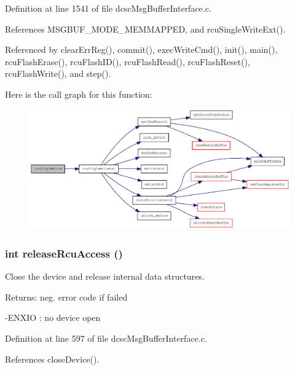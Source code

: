 Definition at line 1541 of file dcsc\-Msg\-Buffer\-Interface.c.

References MSGBUF\_\-MODE\_\-MEMMAPPED, and rcu\-Single\-Write\-Ext().

Referenced by clear\-Err\-Reg(), commit(), exec\-Write\-Cmd(), init(), main(), rcu\-Flash\-Erase(), rcu\-Flash\-ID(), rcu\-Flash\-Read(), rcu\-Flash\-Reset(), rcu\-Flash\-Write(), and step().

Here is the call graph for this function:\begin{figure}[H]
\begin{center}
\leavevmode
\includegraphics[width=349pt]{group__dcsc__msg__buffer__access_g5b2ecab6b0a6383afebde1ea486dae43_cgraph}
\end{center}
\end{figure}
\hypertarget{group__dcsc__msg__buffer__access_gac62a9e57c67af4cb9178b4426ec12fb}{
\subsubsection[releaseRcuAccess]{\setlength{\rightskip}{0pt plus 5cm}int release\-Rcu\-Access ()}}
\label{group__dcsc__msg__buffer__access_gac62a9e57c67af4cb9178b4426ec12fb}


Close the device and release internal data structures. 

\begin{Desc}
\item[Returns:]neg. error code if failed \par
 -ENXIO : no device open \end{Desc}


Definition at line 597 of file dcsc\-Msg\-Buffer\-Interface.c.

References close\-Device().

